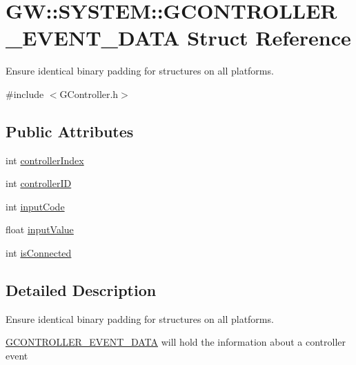 \hypertarget{struct_g_w_1_1_s_y_s_t_e_m_1_1_g_c_o_n_t_r_o_l_l_e_r___e_v_e_n_t___d_a_t_a}{}\section{GW\+:\+:S\+Y\+S\+T\+EM\+:\+:G\+C\+O\+N\+T\+R\+O\+L\+L\+E\+R\+\_\+\+E\+V\+E\+N\+T\+\_\+\+D\+A\+TA Struct Reference}
\label{struct_g_w_1_1_s_y_s_t_e_m_1_1_g_c_o_n_t_r_o_l_l_e_r___e_v_e_n_t___d_a_t_a}


Ensure identical binary padding for structures on all platforms.  




{\ttfamily \#include $<$G\+Controller.\+h$>$}

\subsection*{Public Attributes}
\begin{DoxyCompactItemize}
\item 
int \mbox{\hyperlink{struct_g_w_1_1_s_y_s_t_e_m_1_1_g_c_o_n_t_r_o_l_l_e_r___e_v_e_n_t___d_a_t_a_afe34a20f1171d42f67fa364174f49864}{controller\+Index}}
\item 
int \mbox{\hyperlink{struct_g_w_1_1_s_y_s_t_e_m_1_1_g_c_o_n_t_r_o_l_l_e_r___e_v_e_n_t___d_a_t_a_a436b1993c1b69cf51e3baa122a2927f2}{controller\+ID}}
\item 
int \mbox{\hyperlink{struct_g_w_1_1_s_y_s_t_e_m_1_1_g_c_o_n_t_r_o_l_l_e_r___e_v_e_n_t___d_a_t_a_a0b8f01eefbd8fdb0b11da6bef3ba6e5d}{input\+Code}}
\item 
float \mbox{\hyperlink{struct_g_w_1_1_s_y_s_t_e_m_1_1_g_c_o_n_t_r_o_l_l_e_r___e_v_e_n_t___d_a_t_a_a919e5866e08ed8a84c4157c272045217}{input\+Value}}
\item 
int \mbox{\hyperlink{struct_g_w_1_1_s_y_s_t_e_m_1_1_g_c_o_n_t_r_o_l_l_e_r___e_v_e_n_t___d_a_t_a_a75772bfa2f01fe8408ffec36be9f0c70}{is\+Connected}}
\end{DoxyCompactItemize}


\subsection{Detailed Description}
Ensure identical binary padding for structures on all platforms. 

\mbox{\hyperlink{struct_g_w_1_1_s_y_s_t_e_m_1_1_g_c_o_n_t_r_o_l_l_e_r___e_v_e_n_t___d_a_t_a}{G\+C\+O\+N\+T\+R\+O\+L\+L\+E\+R\+\_\+\+E\+V\+E\+N\+T\+\_\+\+D\+A\+TA}} will hold the information about a controller event 

